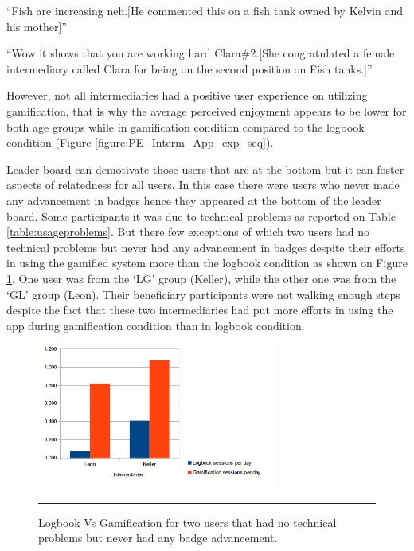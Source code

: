 \begin{enumerate}
 {``Fish are increasing neh.[He commented this on a fish tank owned by Kelvin and his mother]''} 

 {``Wow it shows that you are working hard  Clara\#2.[She congratulated a female intermediary called Clara for being on the second position on Fish tanks.]''} 

However, not all intermediaries had a positive user experience on utilizing gamification, that is why the average perceived enjoyment appears to be lower for both age groups while in gamification condition compared to the logbook condition (Figure \ref{figure:PE_Interm_App_exp_seq}).

\end{enumerate} 

Leader-board can demotivate those users that are at the bottom but it can foster aspects of relatedness for all users\citep{sailer2013:psychological}. In this case there were users who never made any advancement in badges hence they appeared at the bottom of the leader board. Some participants it was due to technical problems as reported on Table \ref{table:usageproblems}. But there few exceptions of which two users had no technical problems but never had any advancement in badges despite their efforts in using the gamified system more than the logbook condition as shown on Figure \ref{figure:badge_failure_2}. One user was from the `LG' group (Keller), while the other one was from the `GL' group (Leon).  Their beneficiary participants were not walking enough steps despite the fact that these two intermediaries had put  more efforts in using the app during gamification condition than in logbook condition.
\begin{figure}[htbp]
  \centering
    \includegraphics[width=0.7\textwidth]{Figures/badgesfailures2.png}
    \rule{35em}{0.5pt}
  \caption{Logbook Vs Gamification for two users that had no technical problems but never had any badge advancement.}
  \label{figure:badge_failure_2}
\end{figure}

